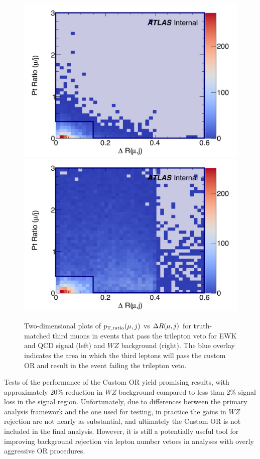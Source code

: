 \begin{figure}[htbp]
  \centering
  \includegraphics[width=.48\textwidth]{figs/ssww_13tev/custom_or/sig_Muon_DR_PtRatio_edited}
  \includegraphics[width=.48\textwidth]{figs/ssww_13tev/custom_or/bkg_Muon_DR_PtRatio_edited}
  \caption{Two-dimensional plots of $p_{\textrm{T},\textrm{ratio}}(\mu,j)$ vs $\Delta R(\mu,j)$ for truth-matched third muons in events that pass the trilepton veto for EWK and QCD \ssww signal (left) and $WZ$ background (right).  The blue overlay indicates the area in which the third leptons will pass the custom OR and result in the event failing the trilepton veto.}
  \label{fig:ssww13tev_customor_muon_2d}
\end{figure}

Tests of the performance of the Custom OR yield promising results, with approximately 20\% reduction in $WZ$ background compared to less than 2\% signal loss in the signal region.
Unfortunately, due to differences between the primary analysis framework and the one used for testing, in practice the gains in $WZ$ rejection are not nearly as substantial, and ultimately the Custom OR is not included in the final analysis.
However, it is still a potentially useful tool for improving background rejection via lepton number vetoes in analyses with overly aggressive OR procedures.
